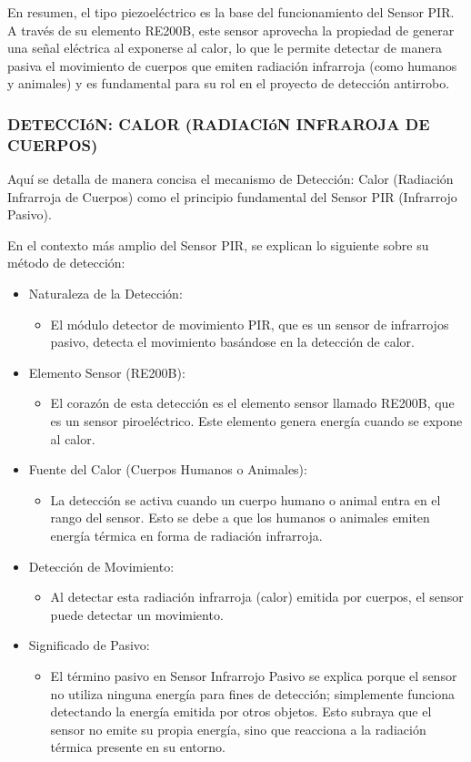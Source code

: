 \documentclass{report}
\begin{document}
En resumen, el tipo piezoeléctrico es la base del funcionamiento del Sensor PIR. A través de su elemento RE200B, este sensor aprovecha la propiedad 
de generar una señal eléctrica al exponerse al calor, lo que le permite detectar de manera pasiva el movimiento de cuerpos que emiten radiación 
infrarroja (como humanos y animales) y es fundamental para su rol en el proyecto de detección antirrobo.

\subsubsection{DETECCIóN: CALOR (RADIACIóN INFRAROJA DE CUERPOS)}
Aquí se detalla de manera concisa el mecanismo de Detección: Calor (Radiación Infrarroja de Cuerpos) 
como el principio fundamental del Sensor PIR (Infrarrojo Pasivo).

En el contexto más amplio del Sensor PIR, se  explican lo siguiente sobre su método de detección:
\begin{itemize}
    \item Naturaleza de la Detección:
    \begin{itemize}
        \item El módulo detector de movimiento PIR, que es un sensor de infrarrojos pasivo, detecta el movimiento basándose en la detección de calor.
    \end{itemize}
    \item Elemento Sensor (RE200B):
    \begin{itemize}
        \item El corazón de esta detección es el elemento sensor llamado RE200B, que es un sensor piroeléctrico. Este elemento genera energía cuando se 
        expone al calor.
    \end{itemize}
    \item Fuente del Calor (Cuerpos Humanos o Animales):
    \begin{itemize}
        \item La detección se activa cuando un cuerpo humano o animal entra en el rango del sensor. Esto se debe a que los humanos o animales emiten 
        energía térmica en forma de radiación infrarroja.
    \end{itemize}
    \item Detección de Movimiento:
    \begin{itemize}
        \item Al detectar esta radiación infrarroja (calor) emitida por cuerpos, el sensor puede detectar un movimiento.
    \end{itemize}
    \item Significado de Pasivo:
    \begin{itemize}
        \item El término pasivo en Sensor Infrarrojo Pasivo se explica porque el sensor no utiliza ninguna energía para fines de detección; simplemente 
        funciona detectando la energía emitida por otros objetos. Esto subraya que el sensor no emite su propia energía, sino que reacciona a la radiación 
        térmica presente en su entorno.
    \end{itemize}
\end{itemize}
\end{document}
